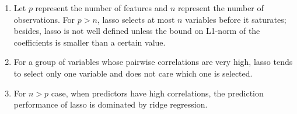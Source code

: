 \documentclass[11pt]{article}
\begin{document}
\begin{enumerate} 

\item

Let $p$ represent the number of features and $n$ represent the number of observations. For $p>n$, lasso selects at most $n$ variables before it saturates; besides, lasso is not well defined unless the bound on L1-norm of the coefficients is smaller than a certain value.
\item

For a group of variables whose pairwise correlations are very high, lasso tends to select only one variable and does not care which one is selected.

\item

 For $n>p$ case, when predictors have high correlations, the prediction performance of lasso is dominated by ridge regression.\\ \\

\end{enumerate}
\end{document}
